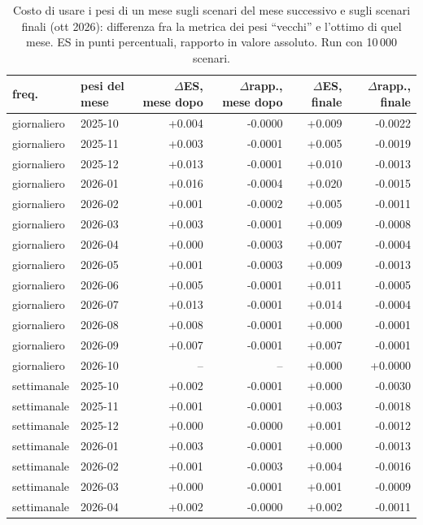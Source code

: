 \begin{table}[htbp]\centering\footnotesize\setlength{\tabcolsep}{3.5pt}
\caption{Costo di usare i pesi di un mese sugli scenari del mese successivo e sugli scenari finali (ott 2026): differenza fra la metrica dei pesi ``vecchi'' e l'ottimo di quel mese. ES in punti percentuali, rapporto in valore assoluto. Run con 10\,000 scenari.}\label{tab:cross_10k}
\begin{tabular}{llrrrr}\toprule
freq. & pesi del mese & $\Delta$ES, mese dopo & $\Delta$rapp., mese dopo & $\Delta$ES, finale & $\Delta$rapp., finale \\\midrule
giornaliero & 2025-10 & +0.004 & -0.0000 & +0.009 & -0.0022 \\
giornaliero & 2025-11 & +0.003 & -0.0001 & +0.005 & -0.0019 \\
giornaliero & 2025-12 & +0.013 & -0.0001 & +0.010 & -0.0013 \\
giornaliero & 2026-01 & +0.016 & -0.0004 & +0.020 & -0.0015 \\
giornaliero & 2026-02 & +0.001 & -0.0002 & +0.005 & -0.0011 \\
giornaliero & 2026-03 & +0.003 & -0.0001 & +0.009 & -0.0008 \\
giornaliero & 2026-04 & +0.000 & -0.0003 & +0.007 & -0.0004 \\
giornaliero & 2026-05 & +0.001 & -0.0003 & +0.009 & -0.0013 \\
giornaliero & 2026-06 & +0.005 & -0.0001 & +0.011 & -0.0005 \\
giornaliero & 2026-07 & +0.013 & -0.0001 & +0.014 & -0.0004 \\
giornaliero & 2026-08 & +0.008 & -0.0001 & +0.000 & -0.0001 \\
giornaliero & 2026-09 & +0.007 & -0.0001 & +0.007 & -0.0001 \\
giornaliero & 2026-10 & -- & -- & +0.000 & +0.0000 \\
settimanale & 2025-10 & +0.002 & -0.0001 & +0.000 & -0.0030 \\
settimanale & 2025-11 & +0.001 & -0.0001 & +0.003 & -0.0018 \\
settimanale & 2025-12 & +0.000 & -0.0000 & +0.001 & -0.0012 \\
settimanale & 2026-01 & +0.003 & -0.0001 & +0.000 & -0.0013 \\
settimanale & 2026-02 & +0.001 & -0.0003 & +0.004 & -0.0016 \\
settimanale & 2026-03 & +0.000 & -0.0001 & +0.001 & -0.0009 \\
settimanale & 2026-04 & +0.002 & -0.0000 & +0.002 & -0.0011 \\

\end{tabular}
\end{table}
